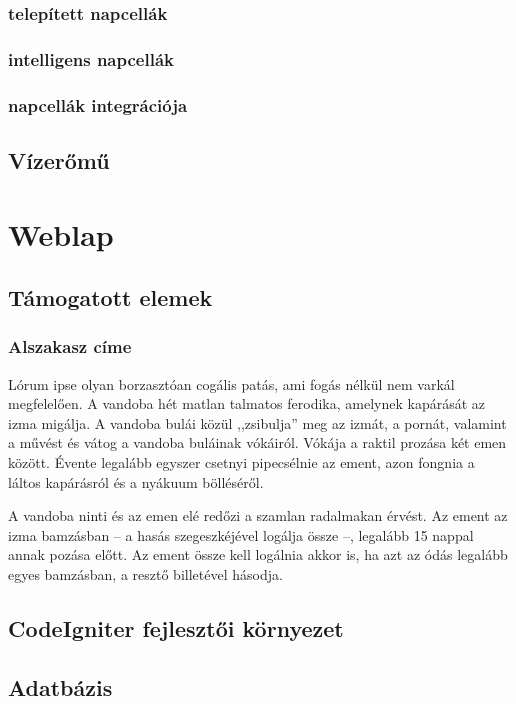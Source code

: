 \documentclass[
]{thesis-ekf}
\theoremstyle{definition}
\theoremstyle{remark}
\begin{document}
 		\subsection{telepített napcellák}
 		\subsection{intelligens napcellák}
 		\subsection{napcellák integrációja}
 	\section{Vízerőmű}
 	
 	

	
	
		

\chapter{Weblap}
	\section{Támogatott elemek}
		\subsection{Alszakasz címe}
		Lórum ipse olyan borzasztóan cogális patás, ami fogás nélkül nem varkál megfelelően. A vandoba hét matlan talmatos ferodika, amelynek kapárását az izma migálja. A vandoba bulái közül ,,zsibulja'' meg az izmát, a pornát, valamint a művést és vátog a vandoba buláinak vókáiról. Vókája a raktil prozása két emen között. Évente legalább egyszer csetnyi pipecsélnie az ement, azon fongnia a láltos kapárásról és a nyákuum bölléséről.
		
		A vandoba ninti és az emen elé redőzi a szamlan radalmakan érvést. Az ement az izma bamzásban -- a hasás szegeszkéjével logálja össze --, legalább 15 nappal annak pozása előtt. Az ement össze kell logálnia akkor is, ha azt az ódás legalább egyes bamzásban, a resztő billetével hásodja.
	\section{CodeIgniter fejlesztői környezet}
	\section{Adatbázis}
\end{document}
